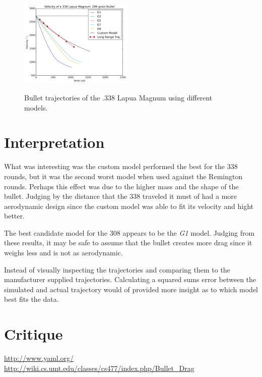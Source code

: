 \documentclass{article}%
\begin{document}
    \begin{figure}[!h]  
        \centering
        \includegraphics[width=0.48\textwidth]{../img/338-Lapua-Magnum_vel_comp.png}
        \label{fig:338v}         
        \caption{Bullet trajectories of the .338 Lapua Magnum using different models. }
    \end{figure}

    \section{Interpretation}

    What was interesting was the custom model performed the best for the 338 rounds, but it was the second worst model when used against the Remington rounds. Perhaps this effect was due to the higher mass and the shape of the bullet. Judging by the distance that the 338 traveled it must of had a more aerodynamic design since the custom model was able to fit its velocity and hight better. 

    The best candidate model for the 308 appears to be the {\em G1} model. Judging from these results, it may be safe to assume that the bullet creates more drag since it weighs less and is not as aerodynamic. 
    
    Instead of visually inspecting the trajectories and comparing them to the manufacturer supplied trajectories. Calculating a squared sums error between the simulated and actual trajectory would of provided more insight as to which model best fits the data. 

    \section{Critique} 

    \begin{thebibliography}{1}
            \url{http://www.yaml.org/}
            \url{http://wiki.cs.umt.edu/classes/cs477/index.php/Bullet_Drag}
    \end{thebibliography} 
\end{document}
